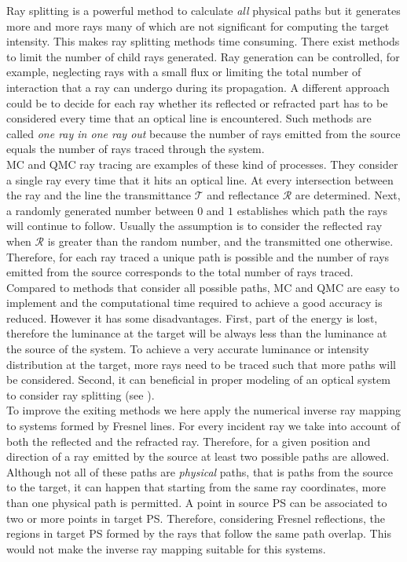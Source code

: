 Ray splitting is a powerful method to calculate \textit{all} physical paths but it generates more and more rays many of which are not significant for computing the target intensity. This makes ray splitting methods time consuming. 
There exist methods to limit the number of child rays generated. Ray generation can be controlled, for example, neglecting rays with a small flux or limiting the total number of interaction that a ray can undergo during its propagation. A different approach could be to decide for each ray whether its reflected or refracted part has to be considered every time that an optical line is encountered. Such methods are called \textit{one ray in one ray out} because the number of rays emitted from the source equals the number of rays traced through the system.\\ \indent
MC and QMC ray tracing are examples of these kind of processes. They consider a single ray every time that it hits an optical line. At every intersection between the ray and the line the transmittance $\mathcal{T}$ and reflectance $\mathcal{R}$ are determined. Next, a randomly generated number between $0$ and $1$ establishes which path the rays will continue to follow. Usually the assumption is to consider the reflected ray when $\mathcal{R}$ is greater than the random number, and the transmitted one otherwise. Therefore, for each ray traced a unique path is possible and the number of rays emitted from the source corresponds to the total number of rays traced. Compared to methods that consider all possible paths, MC and QMC are easy to implement and the computational time required to achieve a good accuracy is reduced. However it has some disadvantages. First, part of the energy is lost, therefore the luminance at the target will be always less than the luminance at the source of the system. To achieve a very accurate luminance or intensity distribution at the target, more rays need to be traced such that more paths will be considered.
Second, it can beneficial in proper modeling of an optical system to consider ray splitting (see \cite{koshel2012illumination}).
\\ \indent 
To improve the exiting methods we here apply the numerical inverse ray mapping to systems formed by Fresnel lines. For every incident ray we take into account of both the reflected and the refracted ray. Therefore, for a given position and direction of a ray emitted by the source at least two possible paths are allowed. Although not all of these paths are \textit{physical} paths, that is paths from the source to the target, it can happen that starting from the same ray coordinates, more than one physical path is permitted. A point in source PS can be associated to two or more points in target PS. Therefore, considering Fresnel reflections, the regions in target PS formed by the rays that follow the same path overlap. This would not make the inverse ray mapping suitable for this systems.
